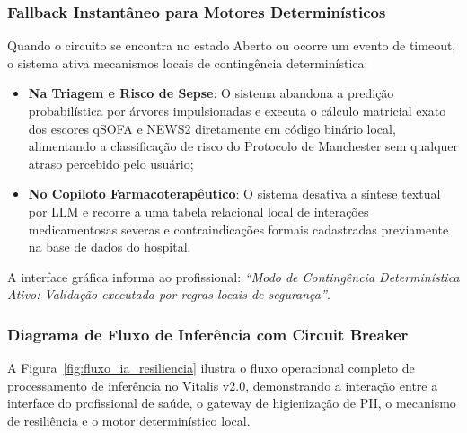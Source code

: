 \subsubsection{Fallback Instantâneo para Motores Determinísticos}
Quando o circuito se encontra no estado Aberto ou ocorre um evento de timeout, o sistema ativa mecanismos locais de contingência determinística:
\begin{itemize}
    \item \textbf{Na Triagem e Risco de Sepse}: O sistema abandona a predição probabilística por árvores impulsionadas e executa o cálculo matricial exato dos escores qSOFA e NEWS2 diretamente em código binário local, alimentando a classificação de risco do Protocolo de Manchester sem qualquer atraso percebido pelo usuário;
    \item \textbf{No Copiloto Farmacoterapêutico}: O sistema desativa a síntese textual por LLM e recorre a uma tabela relacional local de interações medicamentosas severas e contraindicações formais cadastradas previamente na base de dados do hospital.
\end{itemize}

A interface gráfica informa ao profissional: \textit{``Modo de Contingência Determinística Ativo: Validação executada por regras locais de segurança''}.

\subsubsection{Diagrama de Fluxo de Inferência com Circuit Breaker}
A Figura~\ref{fig:fluxo_ia_resiliencia} ilustra o fluxo operacional completo de processamento de inferência no Vitalis v2.0, demonstrando a interação entre a interface do profissional de saúde, o gateway de higienização de PII, o mecanismo de resiliência e o motor determinístico local.

